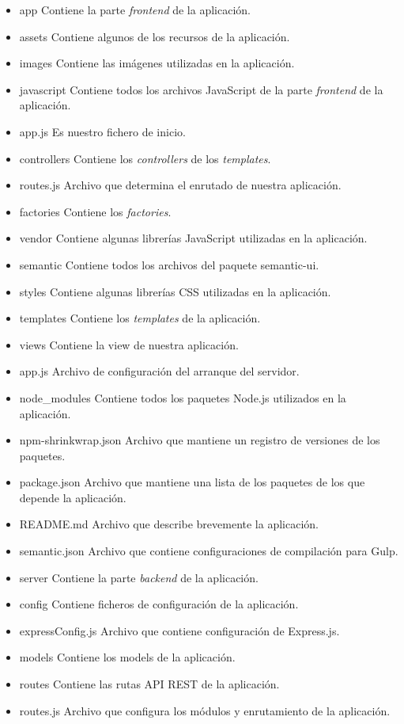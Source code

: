 \begin{itemize}
\item app
Contiene la parte \textit{frontend} de la aplicación.
\item assets
Contiene algunos de los recursos de la aplicación.
\item images
Contiene las imágenes utilizadas en la aplicación.
\item javascript
Contiene todos los archivos JavaScript de la parte \textit{frontend} de la aplicación.
\item app.js
Es nuestro fichero de inicio.
\item controllers
Contiene los \textit{controllers} de los \textit{templates}.
\item routes.js
Archivo que determina el enrutado de nuestra aplicación.
\item factories
Contiene los \textit{factories}.
\item vendor
Contiene algunas librerías JavaScript utilizadas en la aplicación.
\item semantic
Contiene todos los archivos del paquete semantic-ui.
\item styles
Contiene algunas librerías CSS utilizadas en la aplicación.
\item templates
Contiene los \textit{templates} de la aplicación.
\item views
Contiene la view de nuestra aplicación.
\item app.js
Archivo de configuración del arranque del servidor.
\item node\_modules
Contiene todos los paquetes Node.js utilizados en la aplicación.
\item npm-shrinkwrap.json
Archivo que mantiene un registro de versiones de los paquetes. 
\item package.json
Archivo que mantiene una lista de los paquetes de los que depende la aplicación.
\item README.md
Archivo que describe brevemente la aplicación.
\item semantic.json
Archivo que contiene configuraciones de compilación para Gulp.
\item server
Contiene la parte \textit{backend} de la aplicación.
\item config
Contiene ficheros de configuración de la aplicación.
\item expressConfig.js
Archivo que contiene configuración de Express.js.
\item models
Contiene los models de la aplicación.
\item routes
Contiene las rutas API REST de la aplicación.
\item routes.js
Archivo que configura los módulos y enrutamiento de la aplicación.
\end{itemize}



